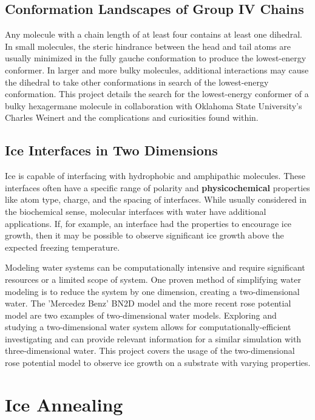 \subsection{Conformation Landscapes of Group IV Chains}

Any molecule with a chain length of at least four contains at least one dihedral. 
In small molecules, the steric hindrance between the head and tail atoms are usually minimized in the fully gauche conformation to produce the lowest-energy conformer. 
In larger and more bulky molecules, additional interactions may cause the dihedral to take other conformations in search of the lowest-energy conformation. 
This project details the search for the lowest-energy conformer of a bulky hexagermane molecule in collaboration with Oklahoma State University's Charles Weinert and the complications and curiosities found within.

\subsection{Ice Interfaces in Two Dimensions}

Ice is capable of interfacing with hydrophobic and amphipathic molecules. 
These interfaces often have a specific range of polarity and \textbf{physicochemical} properties like atom type, charge, and the spacing of interfaces.
While usually considered in the biochemical sense, molecular interfaces with water have additional applications. 
If, for example, an interface had the properties to encourage ice growth, then it may be possible to observe significant ice growth above the expected freezing temperature. 

Modeling water systems can be computationally intensive and require significant resources or a limited scope of system.
One proven method of simplifying water modeling is to reduce the system by one dimension, creating a two-dimensional water.
The 'Mercedez Benz' BN2D model and the more recent rose potential model are two examples of two-dimensional water models.
Exploring and studying a two-dimensional water system allows for computationally-efficient investigating and can provide relevant information for a similar simulation with three-dimensional water.
This project covers the usage of the two-dimensional rose potential model to observe ice growth on a substrate with varying properties.

\section{Ice Annealing}

